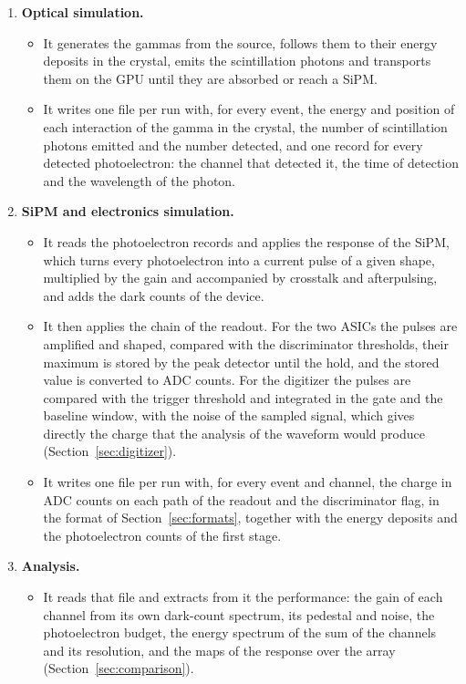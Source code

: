\documentclass[11pt]{article}
\begin{document}
\begin{enumerate}
\item {\bf Optical simulation.}
\begin{itemize}
\item It generates the gammas from the source, follows them to their energy
  deposits in the crystal, emits the scintillation photons and transports
  them on the GPU until they are absorbed or reach a SiPM.
\item It writes one file per run with, for every event, the energy and
  position of each interaction of the gamma in the crystal, the number of
  scintillation photons emitted and the number detected, and one record for
  every detected photoelectron: the channel that detected it, the time of
  detection and the wavelength of the photon.
\end{itemize}
\item {\bf SiPM and electronics simulation.}
\begin{itemize}
\item It reads the photoelectron records and applies the response of the
  SiPM, which turns every photoelectron into a current pulse of a given
  shape, multiplied by the gain and accompanied by crosstalk and
  afterpulsing, and adds the dark counts of the device.
\item It then applies the chain of the readout. For the two ASICs the pulses
  are amplified and shaped, compared with the discriminator thresholds,
  their maximum is stored by the peak detector until the hold, and the
  stored value is converted to ADC counts. For the digitizer the pulses are
  compared with the trigger threshold and integrated in the gate and the
  baseline window, with the noise of the sampled signal, which gives
  directly the charge that the analysis of the waveform would produce
  (Section~\ref{sec:digitizer}).
\item It writes one file per run with, for every event and channel, the
  charge in ADC counts on each path of the readout and the discriminator
  flag, in the format of Section~\ref{sec:formats}, together with the
  energy deposits and the photoelectron counts of the first stage.
\end{itemize}
\item {\bf Analysis.}
\begin{itemize}
\item It reads that file and extracts from it the performance: the gain of
  each channel from its own dark-count spectrum, its pedestal and noise,
  the photoelectron budget, the energy spectrum of the sum of the channels
  and its resolution, and the maps of the response over the array
  (Section~\ref{sec:comparison}).
\end{itemize}
\end{enumerate}
\end{document}
